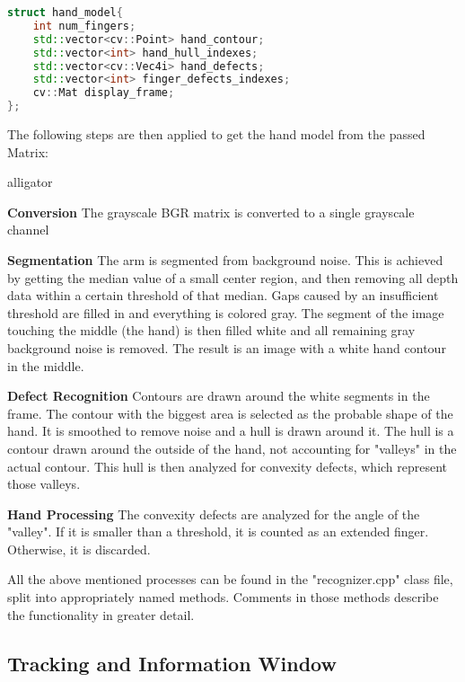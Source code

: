 \documentclass[BSA,Bachelor,english]{twbook}%
\begin{document}
\begin{lstlisting}[language=C++,name={Hand Model Structure},label={rs:hand_model:1}]
struct hand_model{
	int num_fingers;
	std::vector<cv::Point> hand_contour;
	std::vector<int> hand_hull_indexes;
	std::vector<cv::Vec4i> hand_defects;
	std::vector<int> finger_defects_indexes;
	cv::Mat display_frame;
};
\end{lstlisting}

\newpage
The following steps are then applied to get the hand model from the passed Matrix:

\begin{labeling}{alligator}
	\item [\textbf{Conversion}] The grayscale BGR matrix is converted to a single grayscale channel
	\item [\textbf{Segmentation}] The arm is segmented from background noise. This is achieved by getting the median value of a small center region, and then removing all depth data within a certain threshold of that median. Gaps caused by an insufficient threshold are filled in and everything is colored gray. The segment of the image touching the middle (the hand) is then filled white and all remaining gray background noise is removed. The result is an image with a white hand contour in the middle.
	\item [\textbf{Defect Recognition}] Contours are drawn around the white segments in the frame. The contour with the biggest area is selected as the probable shape of the hand. It is smoothed to remove noise and a hull is drawn around it. The hull is a contour drawn around the outside of the hand, not accounting for "valleys" in the actual contour. This hull is then analyzed for convexity defects, which represent those valleys.
	\item [\textbf{Hand Processing}] The convexity defects are analyzed for the angle of the "valley". If it is smaller than a threshold, it is counted as an extended finger. Otherwise, it is discarded.
\end{labeling}


All the above mentioned processes can be found in the "recognizer.cpp" class file, split into appropriately named methods. Comments in those methods describe the functionality in greater detail.

\subsection{Tracking and Information Window}
\end{document}
